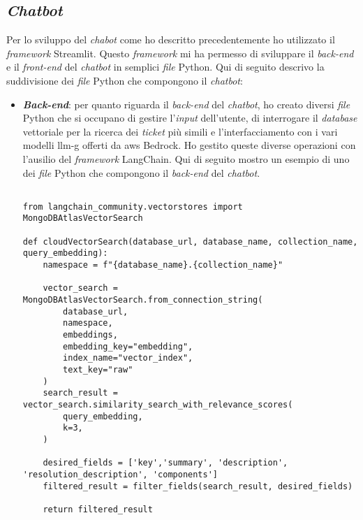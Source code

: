 \subsection{\textit{Chatbot}}
Per lo sviluppo del \textit{chabot} come ho descritto precedentemente ho utilizzato il \textit{framework} Streamlit. Questo \textit{framework} mi ha permesso di sviluppare il \textit{back-end} e il \textit{front-end} del \textit{chatbot} in semplici \textit{file} Python.
Qui di seguito descrivo la suddivisione dei \textit{file} Python che compongono il \textit{chatbot}:
\begin{itemize}
    \item \textbf{\textit{Back-end}}: per quanto riguarda il \textit{back-end} del \textit{chatbot}, ho creato diversi \textit{file} Python che si occupano di gestire l'\textit{input} dell'utente, di interrogare il \textit{database} vettoriale per la ricerca dei \textit{ticket} più simili e l'interfacciamento con i vari modelli \gls{llm-g} offerti da \gls{aws} Bedrock. Ho gestito queste diverse operazioni con l'ausilio del \textit{framework} LangChain. Qui di seguito mostro un esempio di uno dei \textit{file} Python che compongono il \textit{back-end} del \textit{chatbot}.
    \begin{verbatim}

from langchain_community.vectorstores import MongoDBAtlasVectorSearch

def cloudVectorSearch(database_url, database_name, collection_name, query_embedding):
    namespace = f"{database_name}.{collection_name}"

    vector_search = MongoDBAtlasVectorSearch.from_connection_string(
        database_url,
        namespace,
        embeddings,
        embedding_key="embedding",
        index_name="vector_index",
        text_key="raw"
    )
    search_result = vector_search.similarity_search_with_relevance_scores(
        query_embedding,
        k=3,
    )

    desired_fields = ['key','summary', 'description', 'resolution_description', 'components']
    filtered_result = filter_fields(search_result, desired_fields)

    return filtered_result
    \end{verbatim}
    \label{lst:cloudVectorSearch}



\end{itemize}
